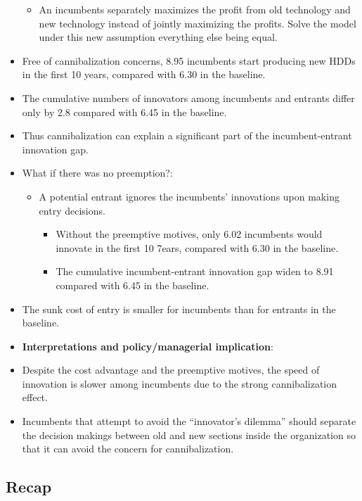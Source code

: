 \documentclass[
]{book}
\providecommand{\tightlist}{%
  \setlength{\itemsep}{0pt}\setlength{\parskip}{0pt}}
\begin{document}
\begin{itemize}
  \begin{itemize}
  \tightlist
  \item
    An incumbents separately maximizes the profit from old technology and new technology instead of jointly maximizing the profits. Solve the model under this new assumption everything else being equal.
  \end{itemize}
\item
  Free of cannibalization concerns, 8.95 incumbents start producing new HDDs in the first 10 years, compared with 6.30 in the baseline.
\item
  The cumulative numbers of innovators among incumbents and entrants differ only by 2.8 compared with 6.45 in the baseline.
\item
  Thus cannibalization can explain a significant part of the incumbent-entrant innovation gap.
\item
  What if there was no preemption?:

  \begin{itemize}
  \tightlist
  \item
    A potential entrant ignores the incumbents' innovations upon making entry decisions.

    \begin{itemize}
    \tightlist
    \item
      Without the preemptive motives, only 6.02 incumbents would innovate in the first 10 7ears, compared with 6.30 in the baseline.
    \item
      The cumulative incumbent-entrant innovation gap widen to 8.91 compared with 6.45 in the baseline.
    \end{itemize}
  \end{itemize}
\item
  The sunk cost of entry is smaller for incumbents than for entrants in the baseline.
\item
  \textbf{Interpretations and policy/managerial implication}:
\item
  Despite the cost advantage and the preemptive motives, the speed of innovation is slower among incumbents due to the strong cannibalization effect.
\item
  Incumbents that attempt to avoid the ``innovator's dilemma'' should separate the decision makings between old and new sections inside the organization so that it can avoid the concern for cannibalization.
\end{itemize}

\hypertarget{recap}{%
\subsection{Recap}\label{recap}}
\end{document}
